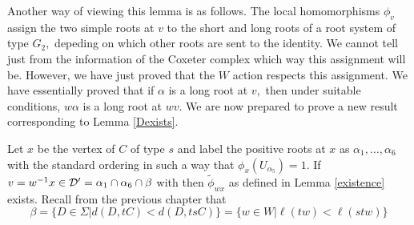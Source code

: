 \documentclass[class=book, crop=false]{standalone}
\begin{document}
Another way of viewing this lemma is as follows. The local homomorphisms $\phi_v$ assign the two simple roots at $v$ to the short and long roots of a root system of type $G_2,$ depeding on which other roots are sent to the identity. We cannot tell just from the information of the Coxeter complex which way this assignment will be. However, we have just proved that the $W$ action respects this assignment. We have essentially proved that if $\alpha$ is a long root at $v,$ then under suitable conditions, $w\alpha$ is a long root at $wv.$ We are now prepared to prove a new result corresponding to Lemma \ref{Dexists}.

\begin{lemma} 
	Let $x$ be the vertex of $C$ of type $s$ and label the positive roots at $x$ as $\alpha_1,\dots,\alpha_6$ with the standard ordering in such a way that $\phi_x(U_{\alpha_5})=1.$ If $v=w^{-1}x\in \mathcal{D}'=\alpha_1\cap \alpha_6\cap \beta$ with then $\tilde{\phi}_{wx}$ as defined in Lemma \ref{existence} exists. Recall from the previous chapter that 
	\[
	\beta=\{D\in \Sigma|d(D,tC)<d(D,tsC)\}=\{w\in W|\ell(tw)<\ell(stw)\}
\]
	\label{336f2Dexists}
\end{lemma}
\end{document}
